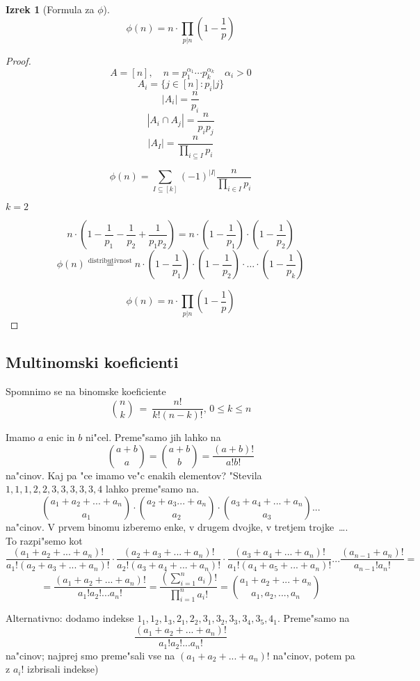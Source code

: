 \documentclass[a4paper,12pt]{article}
\theoremstyle{definition}
\newtheorem{theorem}[counter]{Izrek}
\theoremstyle{remark}
\begin{document}
\begin{theorem}[Formula za $\phi$]
	\[\phi (n) = n \cdot \prod_{p | n} (1 - \frac{1}{p})\]
\end{theorem}
\begin{proof}
	\[A = [n], \quad n = p_1^{\alpha_1} \cdots p_k^{\alpha_k} \quad \alpha_i > 0\]
	\[A_i = \{j \in [n] : p_i | j\} \]
	\[|A_i| = \frac{n}{p_i}\]
	\[|A_i \cap A_j| = \frac{n}{p_i p_j}\]
	\[|A_I| = \frac{n}{\displaystyle \prod_{i \subseteq I} p_i}\]
	
	\[\phi (n) = \sum_{I \subseteq [k]} (-1)^{|I|} \frac{n}{\displaystyle \prod_{i \in I} p_i}\]
	
		$k = 2$ \label{TODO: k=2? kasn k? od kje? kaj to pomen}
	
	\[n\cdot(1 - \frac{1}{p_1} - \frac{1}{p_2} + \frac{1}{p_1 p_2}) = n\cdot(1 - \frac{1}{p_1})\cdot(1 - \frac{1}{p_2})\]
	\[\phi (n) \stackrel{\text{distributivnost}}{=}  n\cdot(1 - \frac{1}{p_1})\cdot(1 - \frac{1}{p_2})\cdot \ldots \cdot(1 - \frac{1}{p_k})\]
	
	\[\phi (n) = n \cdot \prod_{p | n} (1 - \frac{1}{p})\]
\end{proof}

\subsection{Multinomski koeficienti}
Spomnimo se na binomske koeficiente
\[\binom{n}{k} \ = \ \frac{n!}{k! (n - k)!}\text{, } 0 \leqslant k \leqslant n\]

Imamo $a$ enic in $b$ ni"cel. Preme"samo jih lahko na 
\[\binom{a + b}{a} = \binom{a + b}{b} = \frac{(a+b)!}{a!b!}\]
na"cinov. Kaj pa "ce imamo ve"c enakih elementov? "Stevila $1,1,1,2,2,3,3,3,3,3,4$ lahko preme"samo na.
\[\binom{a_1 + a_2 + ... + a_n}{a_1} \cdot \binom{a_2 + a_3 ... + a_n}{a_2} \cdot \binom{a_3 + a_4 + ... + a_n}{a_3} ...\]
na"cinov. V prvem binomu izberemo enke, v drugem dvojke, v tretjem trojke~\ldots. To razpi"semo kot
\[\frac{(a_1 + a_2 + ... + a_n)!}{a_1!(a_2 + a_3 + ... + a_n)!} \cdot \frac{(a_2 + a_3 + ... + a_n)!}{a_2!(a_3 + a_4 + ... + a_n)!} \cdot \frac{(a_3 + a_4 + ... + a_n)!}{a_1!(a_4 + a_5 + ... + a_n)!} ... \frac{(a_{n-1}+a_n)!}{a_{n-1}!a_n!} =\]
\[= \frac{(a_1 + a_2 + ... + a_n)!}{a_1!a_2!...a_n!} = \frac{(\displaystyle \sum_{i = 1}^n a_i)!}{\displaystyle \prod_{i = 1}^n a_i!} = \binom{a_1 + a_2 + ... + a_n}{a_1, a_2, ..., a_n}\]

Alternativno: dodamo indekse $1_1, 1_2, 1_3, 2_1, 2_2, 3_1, 3_2, 3_3, 3_4, 3_5, 4_1$. Preme"samo na
\[\frac{(a_1 + a_2 + ... + a_n)!}{a_1!a_2!...a_n!}\]
na"cinov; najprej smo preme"sali vse na $(a_1 + a_2 + ... + a_n)!$ na"cinov, potem pa z $a_i!$ izbrisali indekse)\\
\end{document}
